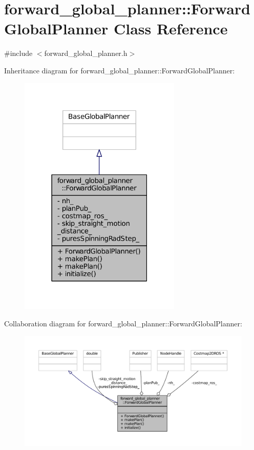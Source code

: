 \hypertarget{classforward__global__planner_1_1ForwardGlobalPlanner}{}\section{forward\+\_\+global\+\_\+planner\+:\+:Forward\+Global\+Planner Class Reference}
\label{classforward__global__planner_1_1ForwardGlobalPlanner}


{\ttfamily \#include $<$forward\+\_\+global\+\_\+planner.\+h$>$}



Inheritance diagram for forward\+\_\+global\+\_\+planner\+:\+:Forward\+Global\+Planner\+:
\nopagebreak
\begin{figure}[H]
\begin{center}
\leavevmode
\includegraphics[width=219pt]{classforward__global__planner_1_1ForwardGlobalPlanner__inherit__graph}
\end{center}
\end{figure}


Collaboration diagram for forward\+\_\+global\+\_\+planner\+:\+:Forward\+Global\+Planner\+:
\nopagebreak
\begin{figure}[H]
\begin{center}
\leavevmode
\includegraphics[width=350pt]{classforward__global__planner_1_1ForwardGlobalPlanner__coll__graph}
\end{center}
\end{figure}
